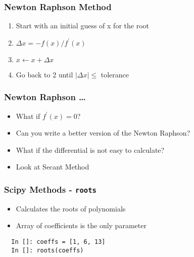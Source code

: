 \documentclass[14pt,compress]{beamer}
\newcommand{\typ}[1]{\lstinline{#1}}
\begin{document}
\begin{frame}[fragile]
\frametitle{Newton Raphson Method}
\begin{enumerate}
\item Start with an initial guess of x for the root
\item $\Delta x = -f(x)/f^{'}(x)$
\item $ x \leftarrow x + \Delta x$
\item Go back to 2 until $|\Delta x| \le$ tolerance
\end{enumerate}
\end{frame}


\begin{frame}[fragile]
\frametitle{Newton Raphson \ldots}
\begin{itemize}
\item What if $f^{'}(x) = 0$?
\item Can you write a better version of the Newton Raphson?
\item What if the differential is not easy to calculate?
\item Look at Secant Method
\end{itemize}
\end{frame}

\begin{frame}[fragile]
\frametitle{Scipy Methods - \typ{roots}}
\begin{itemize}
\item Calculates the roots of polynomials
\item Array of coefficients is the only parameter
\end{itemize}
\begin{lstlisting}
  In []: coeffs = [1, 6, 13]
  In []: roots(coeffs)
\end{lstlisting}
\end{frame}
\end{document}

